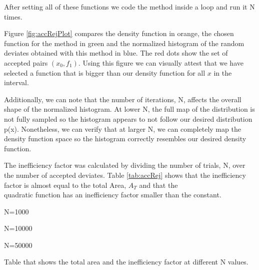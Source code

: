 After setting all of these functions we code the method inside a loop and run it N times. 

Figure \ref{fig:accRejPlot} compares the density function in orange, the chosen function for the method in green and the normalized histogram of the random deviates obtained with this method in blue. 
The red dots show the set of accepted pairs $(x_0,f_1)$. 
Using this figure we can visually attest that we have selected a function that is bigger than our density function for all $x$ in the interval.

Additionally, we can note that the number of iterations, N, affects the overall shape of the normalized histogram. 
At lower N, the full map of the distribution is not fully sampled so the histogram appears to not follow our desired distribution p(x). 
Nonetheless, we can verify that at larger N, we can completely map the density function space so the histogram correctly resembles our desired density function. 

The inefficiency factor was calculated by dividing the number of trials, N, over the number of accepted deviates. Table \ref{tab:accRej} shows that the inefficiency factor is almost equal to the total Area, $A_T$ and that the \\ quadratic function has an inefficiency factor smaller than the constant.

\begin{table}
    \centering
    \begin{subtable}{0.45\textwidth}
    
    \caption{N=1000}
    \end{subtable}
    \begin{subtable}{0.45\textwidth}
    
    \caption{N=10000}
    \end{subtable}
    \begin{subtable}{0.45\textwidth}
    
    \caption{N=50000}
    \end{subtable}
    \caption{Table that shows the total area and the inefficiency factor at different N values.}
    \label{tab:accRej}
\end{table}


